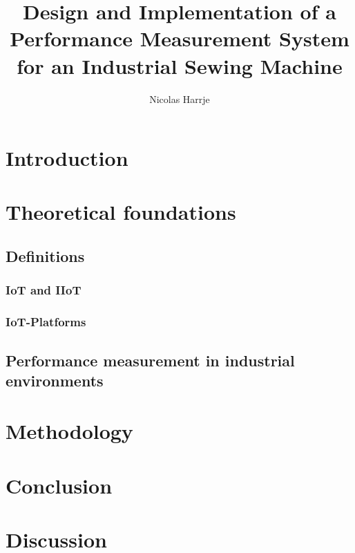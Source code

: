 \documentclass[11pt]{article}
\title{\textbf{Design and Implementation of a Performance Measurement System for an Industrial Sewing Machine}}
\author{Nicolas Harrje}
\date{}
\begin{document}
\maketitle
\thispagestyle{empty}

\tableofcontents
\newpage

\section{Introduction} 
\section{Theoretical foundations}
\subsection{Definitions}
\subsubsection{IoT and IIoT}
\subsubsection{IoT-Platforms}
\subsection{Performance measurement in industrial environments}
\section{Methodology}
\section{Conclusion} 
\section{Discussion}
\end{document}
